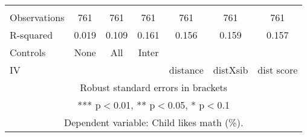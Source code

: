 \begin{tabular}{lcccccc}
 &  &  &  &  &  &  \\
Observations & 761 & 761 & 761 & 761 & 761 & 761 \\
R-squared & 0.019 & 0.109 & 0.161 & 0.156 & 0.159 & 0.157 \\
Controls & None & All & Inter &  &  &  \\
 IV &  &  &  & distance & distXsib & dist score \\ \hline
\multicolumn{7}{c}{ Robust standard errors in brackets} \\
\multicolumn{7}{c}{ *** p$<$0.01, ** p$<$0.05, * p$<$0.1} \\
\multicolumn{7}{c}{ Dependent variable: Child likes math (\%).} \\
\end{tabular}
